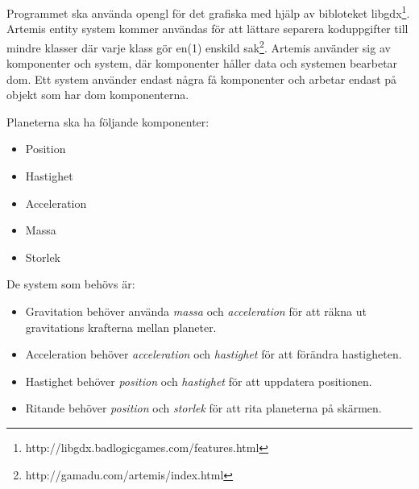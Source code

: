Programmet ska använda opengl för det grafiska med hjälp av bibloteket
libgdx\footnote{http://libgdx.badlogicgames.com/features.html}.
Artemis entity system kommer användas för att lättare separera
koduppgifter till mindre klasser där varje klass gör en(1) enskild
sak\footnote{http://gamadu.com/artemis/index.html}.
Artemis använder sig av komponenter och system,
där komponenter håller data och systemen bearbetar dom.
Ett system använder endast några få komponenter och
arbetar endast på objekt som har dom komponenterna.

Planeterna ska ha följande komponenter:
\begin{itemize}
    \item Position
    \item Hastighet
    \item Acceleration
    \item Massa
    \item Storlek
\end{itemize}
De system som behövs är:
\begin{itemize}
    \item Gravitation behöver använda \textit{massa} och \textit{acceleration}
        för att räkna ut gravitations krafterna mellan planeter.
    \item Acceleration behöver \textit{acceleration} och \textit{hastighet}
        för att förändra hastigheten.
    \item Hastighet behöver \textit{position} och \textit{hastighet}
        för att uppdatera positionen.
    \item Ritande behöver \textit{position} och \textit{storlek} för
        att rita planeterna på skärmen.
\end{itemize}
